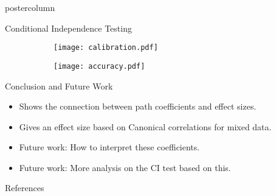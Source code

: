 \documentclass{beamer}
\begin{document}
\begin{frame}
\begin{columns}
\begin{column}{0.33\textwidth}
\begin{beamercolorbox}[center]{postercolumn}
\begin{minipage}{.98\textwidth}
{\begin{myblock}{Conditional Independence Testing}
		\begin{figure}
			\begin{subfigure}{\textwidth}
				\texttt{[image: calibration.pdf]}
				\caption{}
			\end{subfigure}
			\begin{subfigure}{\textwidth}
				\texttt{[image: accuracy.pdf]}
				\caption{}
			\end{subfigure}
		\end{figure}
	\end{myblock}\vfill
	\begin{myblock}{Conclusion and Future Work}
		\begin{itemize}
			\item Shows the connection between path coefficients and effect sizes.
			\item Gives an effect size based on Canonical correlations for mixed data.
			\item Future work: How to interpret these coefficients.
			\item Future work: More analysis on the CI test based on this.
		\end{itemize}
	\end{myblock}\vfill
	\begin{myblock}{References}
		\footnotesize
		
		
	\end{myblock}\vfill
		}\end{minipage}\end{beamercolorbox}
	\end{column}
\end{columns}
\end{frame}
\end{document}
